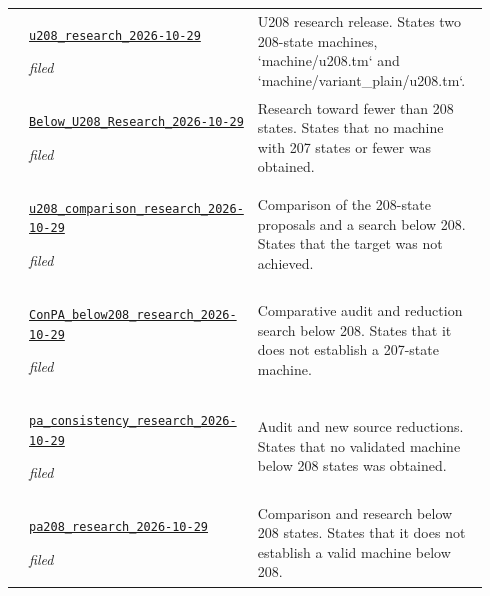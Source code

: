 {\begin{longtable}{@{}>{\raggedright\arraybackslash}p{0.035\linewidth}>{\raggedright\arraybackslash}p{0.345\linewidth}>{\raggedright\arraybackslash}p{0.56\linewidth}@{}}
6 & \href{https://github.com/VladimirReshetnikov/ProveIt/blob/1c9524d8bf2e0a27b9a16ff622359927f536e663/Computability/BusyBeaver/Research/PA/docs/u208_research_2026-10-29/README.txt}{\nolinkurl{u208_research_2026-10-29}}\par\emph{filed} & U208 research release. States two 208-state machines, `machine/u208.tm` and `machine/variant\_plain/u208.tm`.\\[4pt]
7 & \href{https://github.com/VladimirReshetnikov/ProveIt/blob/1c9524d8bf2e0a27b9a16ff622359927f536e663/Computability/BusyBeaver/Research/PA/docs/Below_U208_Research_2026-10-29/README.txt}{\nolinkurl{Below_U208_Research_2026-10-29}}\par\emph{filed} & Research toward fewer than 208 states. States that no machine with 207 states or fewer was obtained.\\[4pt]
8 & \href{https://github.com/VladimirReshetnikov/ProveIt/blob/1c9524d8bf2e0a27b9a16ff622359927f536e663/Computability/BusyBeaver/Research/PA/docs/u208_comparison_research_2026-10-29/README.txt}{\nolinkurl{u208_comparison_research_2026-10-29}}\par\emph{filed} & Comparison of the 208-state proposals and a search below 208. States that the target was not achieved.\\[4pt]
9 & \href{https://github.com/VladimirReshetnikov/ProveIt/blob/1c9524d8bf2e0a27b9a16ff622359927f536e663/Computability/BusyBeaver/Research/PA/docs/ConPA_below208_research_2026-10-29/README.txt}{\nolinkurl{ConPA_below208_research_2026-10-29}}\par\emph{filed} & Comparative audit and reduction search below 208. States that it does not establish a 207-state machine.\\[4pt]
10 & \href{https://github.com/VladimirReshetnikov/ProveIt/blob/1c9524d8bf2e0a27b9a16ff622359927f536e663/Computability/BusyBeaver/Research/PA/docs/pa_consistency_research_2026-10-29/README.txt}{\nolinkurl{pa_consistency_research_2026-10-29}}\par\emph{filed} & Audit and new source reductions. States that no validated machine below 208 states was obtained.\\[4pt]
11 & \href{https://github.com/VladimirReshetnikov/ProveIt/blob/1c9524d8bf2e0a27b9a16ff622359927f536e663/Computability/BusyBeaver/Research/PA/docs/pa208_research_2026-10-29/README.txt}{\nolinkurl{pa208_research_2026-10-29}}\par\emph{filed} & Comparison and research below 208 states. States that it does not establish a valid machine below 208.\\[4pt]

\end{longtable}}
